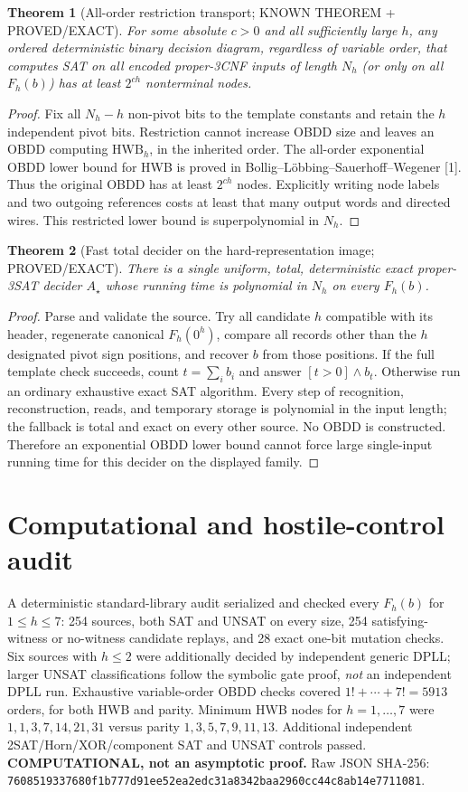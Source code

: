 \documentclass[11pt]{article}
\newtheorem{theorem}{Theorem}
\begin{document}
\begin{theorem}[All-order restriction transport; KNOWN THEOREM + PROVED/EXACT]
For some absolute $c>0$ and all sufficiently large $h$, any ordered deterministic binary decision diagram, regardless of variable order, that computes SAT on all encoded proper-3CNF inputs of length $N_h$ (or only on all $F_h(b)$) has at least $2^{ch}$ nonterminal nodes.
\end{theorem}
\begin{proof}
Fix all $N_h-h$ non-pivot bits to the template constants and retain the $h$ independent pivot bits. Restriction cannot increase OBDD size and leaves an OBDD computing $\mathrm{HWB}_h$, in the inherited order. The all-order exponential OBDD lower bound for HWB is proved in Bollig--L\"obbing--Sauerhoff--Wegener [1]. Thus the original OBDD has at least $2^{ch}$ nodes. Explicitly writing node labels and two outgoing references costs at least that many output words and directed wires. This restricted lower bound is superpolynomial in $N_h$.
\end{proof}

\begin{theorem}[Fast total decider on the hard-representation image; PROVED/EXACT]
There is a single uniform, total, deterministic exact proper-3SAT decider $A_\star$ whose running time is polynomial in $N_h$ on \emph{every} $F_h(b)$.
\end{theorem}
\begin{proof}
Parse and validate the source. Try all candidate $h$ compatible with its header, regenerate canonical $F_h(0^h)$, compare all records other than the $h$ designated pivot sign positions, and recover $b$ from those positions. If the full template check succeeds, count $t=\sum_i b_i$ and answer $[t>0]\land b_t$. Otherwise run an ordinary exhaustive exact SAT algorithm. Every step of recognition, reconstruction, reads, and temporary storage is polynomial in the input length; the fallback is total and exact on every other source. No OBDD is constructed. Therefore an exponential OBDD lower bound cannot force large single-input running time for this decider on the displayed family.
\end{proof}

\section{Computational and hostile-control audit}
A deterministic standard-library audit serialized and checked every $F_h(b)$ for $1\le h\le7$: 254 sources, both SAT and UNSAT on every size, 254 satisfying-witness or no-witness candidate replays, and 28 exact one-bit mutation checks. Six sources with $h\le2$ were additionally decided by independent generic DPLL; larger UNSAT classifications follow the symbolic gate proof, \emph{not} an independent DPLL run. Exhaustive variable-order OBDD checks covered $1!+\cdots+7!=5913$ orders, for both HWB and parity. Minimum HWB nodes for $h=1,\ldots,7$ were $1,1,3,7,14,21,31$ versus parity $1,3,5,7,9,11,13$. Additional independent 2SAT/Horn/XOR/component SAT and UNSAT controls passed. \textbf{COMPUTATIONAL, not an asymptotic proof.} Raw JSON SHA-256:
\texttt{7608519337680f1b777d91ee52ea2edc31a8342baa2960cc44c8ab14e7711081}.
\end{document}
